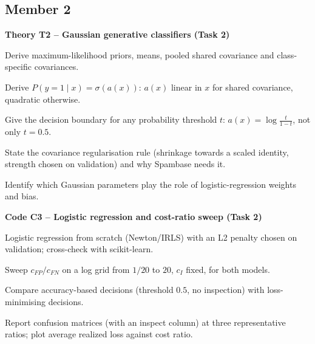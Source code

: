 \documentclass[11pt,a4paper]{article}
\begin{document}
\subsection*{Member 2}
\textbf{Theory T2 -- Gaussian generative classifiers (Task 2)}
\begin{todo}
  \item Derive maximum-likelihood priors, means, pooled shared covariance and class-specific covariances.
  \item Derive $P(y=1\mid x)=\sigma(a(x))$: $a(x)$ linear in $x$ for shared covariance, quadratic otherwise.
  \item Give the decision boundary for any probability threshold $t$: $a(x)=\log\frac{t}{1-t}$, not only $t=0.5$.
  \item State the covariance regularisation rule (shrinkage towards a scaled identity, strength chosen on validation) and why Spambase needs it.
  \item Identify which Gaussian parameters play the role of logistic-regression weights and bias.
\end{todo}
\textbf{Code C3 -- Logistic regression and cost-ratio sweep (Task 2)}
\begin{todo}
  \item Logistic regression from scratch (Newton/IRLS) with an L2 penalty chosen on validation; cross-check with scikit-learn.
  \item Sweep $c_{FP}/c_{FN}$ on a log grid from $1/20$ to $20$, $c_I$ fixed, for both models.
  \item Compare accuracy-based decisions (threshold $0.5$, no inspection) with loss-minimising decisions.
  \item Report confusion matrices (with an inspect column) at three representative ratios; plot average realized loss against cost ratio.
\end{todo}
\end{document}
